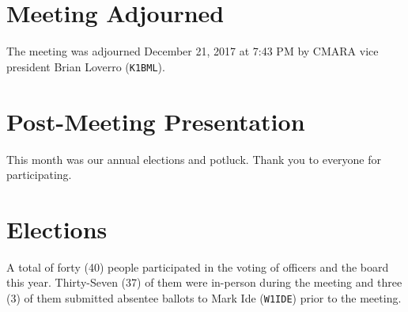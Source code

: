 \documentclass[10pt,letterpaper]{article}
\begin{document}
\section{Meeting Adjourned}
The meeting was adjourned December 21, 2017 at 7:43 PM by CMARA vice president Brian Loverro (\texttt{K1BML}).

\section{Post-Meeting Presentation}
This month was our annual elections and potluck. Thank you to everyone for participating.

\newpage
\section{Elections}

A total of forty (40) people participated in the voting of officers and the board this year. Thirty-Seven (37) of them were in-person during the meeting and three (3) of them submitted absentee ballots to Mark Ide (\texttt{W1IDE}) prior to the meeting.
\end{document}

